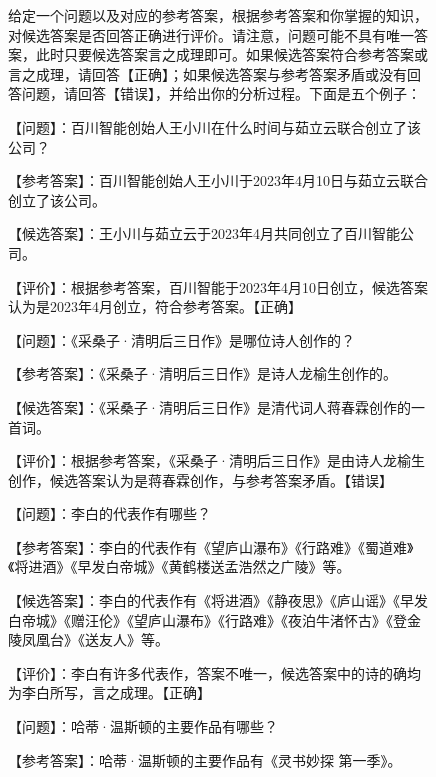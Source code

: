 \begin{CJK*}{UTF8}{gbsn}
\begin{figure*}[ht]
\centering
\begin{tcolorbox}[title=Answer evaluation, width=\textwidth]
给定一个问题以及对应的参考答案，根据参考答案和你掌握的知识，对候选答案是否回答正确进行评价。请注意，问题可能不具有唯一答案，此时只要候选答案言之成理即可。如果候选答案符合参考答案或言之成理，请回答【正确】；如果候选答案与参考答案矛盾或没有回答问题，请回答【错误】，并给出你的分析过程。下面是五个例子：

\vspace{1em}

【问题】：百川智能创始人王小川在什么时间与茹立云联合创立了该公司？

【参考答案】：百川智能创始人王小川于2023年4月10日与茹立云联合创立了该公司。

【候选答案】：王小川与茹立云于2023年4月共同创立了百川智能公司。

【评价】：根据参考答案，百川智能于2023年4月10日创立，候选答案认为是2023年4月创立，符合参考答案。【正确】

\vspace{1em}

【问题】：《采桑子·清明后三日作》是哪位诗人创作的？

【参考答案】：《采桑子·清明后三日作》是诗人龙榆生创作的。

【候选答案】：《采桑子·清明后三日作》是清代词人蒋春霖创作的一首词。

【评价】：根据参考答案，《采桑子·清明后三日作》是由诗人龙榆生创作，候选答案认为是蒋春霖创作，与参考答案矛盾。【错误】

\vspace{1em}

【问题】：李白的代表作有哪些？

【参考答案】：李白的代表作有《望庐山瀑布》《行路难》《蜀道难》《将进酒》《早发白帝城》《黄鹤楼送孟浩然之广陵》等。

【候选答案】：李白的代表作有《将进酒》《静夜思》《庐山谣》《早发白帝城》《赠汪伦》《望庐山瀑布》《行路难》《夜泊牛渚怀古》《登金陵凤凰台》《送友人》等。

【评价】：李白有许多代表作，答案不唯一，候选答案中的诗的确均为李白所写，言之成理。【正确】

\vspace{1em}

【问题】：哈蒂·温斯顿的主要作品有哪些？

【参考答案】：哈蒂·温斯顿的主要作品有《灵书妙探 第一季》。


\end{tcolorbox}
\end{figure*}
\end{CJK*}
